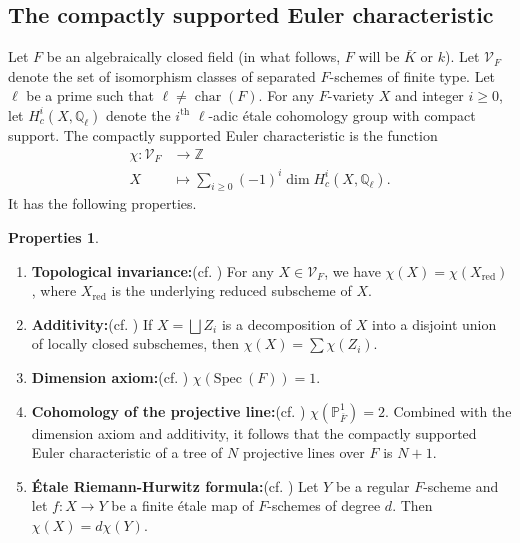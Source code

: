 \documentclass[12pt]{amsart}
\numberwithin{equation}{section}
\theoremstyle{definition}
\newtheorem{properties}[equation]{Properties}
\newcommand{\ol}[1]{\overline{#1}}
\newcommand{\Q}{\mathbb Q}
\newcommand{\Z}{\mathbb Z}
\renewcommand{\P}{\mathbb P}
\newcommand{\Spec}{\mathrm{Spec} \ }
\DeclareMathOperator{\cha}{char}
\begin{document}
\subsection*{The compactly supported Euler characteristic} Let $F$ be an algebraically closed field (in what follows, $F$ will be
$\ol{K}$ or $k$). Let $\mathcal{V}_F$ denote the set of isomorphism
classes of separated $F$-schemes of finite type. Let $\ell$ be a prime such that $\ell \neq \cha(F)$. For any
$F$-variety $X$ and integer $i \geq 0$, let $H^i_c(X,\Q_\ell)$ denote
the $i^{\mathrm{th}}$ $\ell$-adic \'{e}tale cohomology group with
compact support. The compactly supported Euler characteristic is the
function 
 \begin{align*} \chi \colon \mathcal{V}_F &\rightarrow \Z \\ X &\mapsto \sum_{i \geq 0} (-1)^i\dim H^i_c(X,\Q_{\ell}). \end{align*}
It has the following properties.
\begin{properties}\label{Peulerchar}\hfill 
\begin{enumerate}[label=(\arabic*)]
\item\label{Etopinv} \textbf{Topological invariance:}(cf. \cite[Chapter~1, Section~2, p.~22]{Milne}) For any $X \in \mathcal{V}_F$, we have $\chi(X) = \chi(X_{\mathrm{red}})$, where $X_{\mathrm{red}}$ is the underlying reduced subscheme of $X$.
\item\label{Eadditivity} \textbf{Additivity:}(cf. \cite[Chapter~1, Section~9, p.~65]{Milne}) If $X = \bigsqcup Z_i$ is a decomposition of $X$ into a disjoint union of locally closed subschemes, then $\chi(X) = \sum \chi(Z_i)$.
\item\label{Epoint} \textbf{Dimension axiom:}(cf. \cite[Chapter~1, Section~9, p.~65]{Milne}) $\chi(\Spec(F)) = 1$.
\item\label{Echain} \textbf{Cohomology of the projective line:}(cf. \cite[Chapter~1, Section~14, p.~90]{Milne})
  $\chi(\P^1_{\overline{F}}) = 2$. Combined with the dimension axiom
  and additivity, it follows that the compactly supported Euler
  characteristic of a tree of $N$ projective lines over $F$ is $N+1$.
\item\label{ERHformula} \textbf{\'{E}tale Riemann-Hurwitz formula:}(cf. \cite[Chapter~V, Remark~2.15~(c)]{MilnePrint}) Let $Y$ be a
  regular $F$-scheme and let $f \colon X \rightarrow Y$ be a finite
  \'{e}tale map of $F$-schemes of degree $d$.  Then $\chi(X) = d
  \chi(Y)$.
\end{enumerate}
\end{properties}
\end{document}
